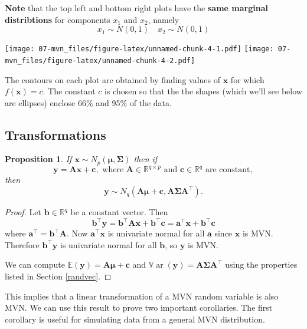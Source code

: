 \documentclass[
]{book}
\newtheorem{proposition}{Proposition}[chapter]
\theoremstyle{definition}
\theoremstyle{definition}
\theoremstyle{definition}
\theoremstyle{definition}
\theoremstyle{remark}
\begin{document}
\textbf{Note} that the top left and bottom right plots have the \textbf{same marginal distribtions} for components \(x_1\) and \(x_2\), namely
\[x_1 \sim N(0, 1)\quad x_2 \sim N(0, 1)\]

\texttt{[image: 07-mvn\_files/figure-latex/unnamed-chunk-4-1.pdf]} \texttt{[image: 07-mvn\_files/figure-latex/unnamed-chunk-4-2.pdf]}

The contours on each plot are obtained by finding values of \(\mathbf x\) for which \(f(\mathbf x)=c\). The constant \(c\) is chosen so that the the shapes (which we'll see below are ellipses)
enclose 66\% and 95\% of the data.

\hypertarget{transformations}{%
\subsection{Transformations}\label{transformations}}

\begin{proposition}
\protect\hypertarget{prp:six2}{}\label{prp:six2}If \(\mathbf x\sim N_p({\boldsymbol{\mu}},\boldsymbol{\Sigma})\) then if \[\mathbf y= \mathbf A\mathbf x+ \mathbf c, \mbox{ where } \mathbf A\in \mathbb{R}^{q \times p} \mbox{ and }\mathbf c\in \mathbb{R}^q
  \mbox{ are constant},\] then
\[\mathbf y\sim N_q(\mathbf A{\boldsymbol{\mu}}+ \mathbf c, \mathbf A\boldsymbol{\Sigma}\mathbf A^\top).\]
\end{proposition}

\begin{proof}
Let \(\mathbf b\in \mathbb{R}^q\) be a constant vector. Then
\[ \mathbf b^\top \mathbf y= \mathbf b^\top \mathbf A\mathbf x+ \mathbf b^\top \mathbf c= \mathbf a^\top \mathbf x+ \mathbf b^\top \mathbf c\]
where \(\mathbf a^\top = \mathbf b^\top \mathbf A\). Now \(\mathbf a^\top \mathbf x\) is univariate normal for all \(\mathbf a\) since \(\mathbf x\) is MVN. Therefore \(\mathbf b^\top \mathbf y\) is univariate normal for all \(\mathbf b\), so \(\mathbf y\) is MVN.

We can compute \({\mathbb{E}}(\mathbf y)=\mathbf A{\boldsymbol{\mu}}+\mathbf c\) and \({\mathbb{V}\operatorname{ar}}(\mathbf y)=\mathbf A\boldsymbol{\Sigma}\mathbf A^\top\) using the properties listed in Section \ref{randvec}.
\end{proof}

This implies that a linear transformation of a MVN random variable is also MVN. We can use this result to prove two important corollaries. The first corollary is useful for simulating data from a general MVN distribution.
\end{document}
